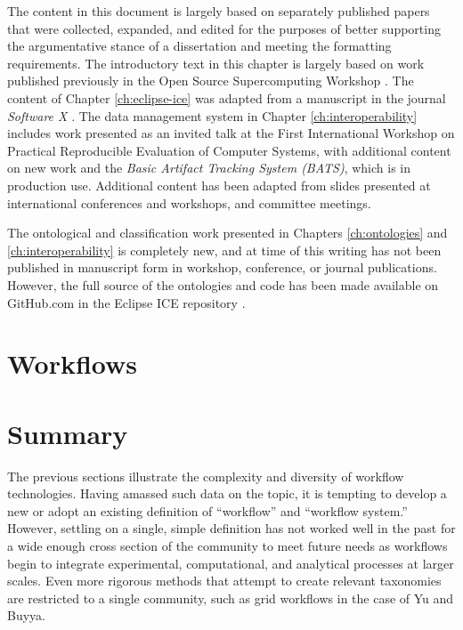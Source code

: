 The content in this document is largely based on separately published papers
that were collected, expanded, and edited for the purposes of better supporting
the argumentative stance of a dissertation and meeting the formatting
requirements. The introductory text in this chapter is largely based on
work published previously in the Open Source Supercomputing Workshop
\cite{billings_toward_2017}. The content of Chapter \ref{ch:eclipse-ice} was
adapted from a manuscript in the journal \textit{Software X}
\cite{billings_eclipse_2018}. The data management system in Chapter
\ref{ch:interoperability} includes work presented as an invited talk at the
First International Workshop on Practical Reproducible Evaluation of Computer
Systems, with additional content on new work and the \textit{Basic Artifact
Tracking System (BATS)}, which is in production use. Additional content has
been adapted from slides presented at international conferences and workshops,
and committee meetings.

The ontological and classification work presented in Chapters
\ref{ch:ontologies} and \ref{ch:interoperability} is completely new, and at
time of this writing has not been published in manuscript form in
workshop, conference, or journal publications. However, the full source of the
ontologies and code has been made available on GitHub.com in the Eclipse ICE repository
\cite{billings_ice_2019}.

\section{Workflows}


\section{Summary}

The previous sections illustrate the complexity and diversity of workflow
technologies. Having amassed such data on the topic, it is tempting to develop
a new or adopt an existing definition of ``workflow'' and ``workflow system.''
However, settling on a single, simple definition has not worked well in the past
for a wide enough cross section of the community to meet future needs as workflows
begin to integrate experimental, computational, and analytical processes at
larger scales. Even more rigorous methods that attempt to create relevant
taxonomies are restricted to a single community, such as grid workflows in the
case of Yu and Buyya.


